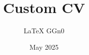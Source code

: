 \documentclass[orange]{customcv}
\title{Custom CV}
\author{\LaTeX{} GGn0}
\date{May 2025}
\begin{document}
\subsection*{}
\vspace{10em}

\setlength{\columnsep}{1cm}


\begin{paracol}{2}

\setbgcolor


\flushleft
\vspace{1cm}












\switchcolumn
\flushright


\begin{minipage}[t]{0.6\textwidth}
	
\end{minipage}
\vspace{0.5cm}


\begin{minipage}[t]{0.6\textwidth}
	
\end{minipage}
\vspace{0.5cm}


\begin{minipage}[t]{0.6\textwidth}
	
\end{minipage}


\end{paracol}

\end{document}
